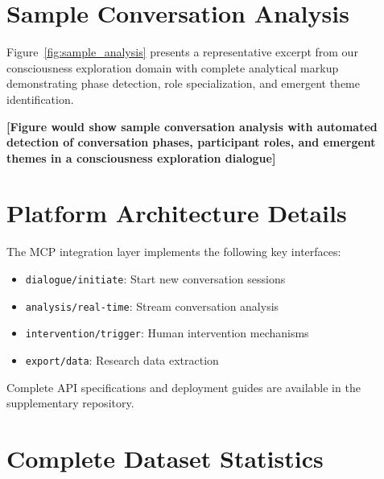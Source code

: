 \documentclass{article}
\newcommand{\mcp}{\textsc{MCP}}
\begin{document}



\appendix

\section{Sample Conversation Analysis}
\label{app:conversation}

Figure~\ref{fig:sample_analysis} presents a representative excerpt from our consciousness exploration domain with complete analytical markup demonstrating phase detection, role specialization, and emergent theme identification.


\textbf{[Figure would show sample conversation analysis with automated detection of conversation phases, participant roles, and emergent themes in a consciousness exploration dialogue]}

\section{Platform Architecture Details}
\label{app:architecture}

The \mcp{} integration layer implements the following key interfaces:

\begin{itemize}
    \item \texttt{dialogue/initiate}: Start new conversation sessions
    \item \texttt{analysis/real-time}: Stream conversation analysis
    \item \texttt{intervention/trigger}: Human intervention mechanisms  
    \item \texttt{export/data}: Research data extraction
\end{itemize}

Complete API specifications and deployment guides are available in the supplementary repository.

\section{Complete Dataset Statistics}
\label{app:statistics}
\end{document}
